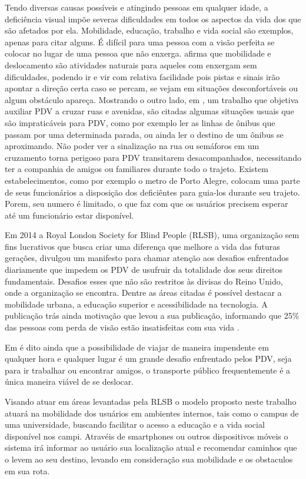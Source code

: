 \documentclass[english,brazilian]{UNISINOSmonografia}
\begin{document}
Tendo diversas causas possíveis e atingindo pessoas em qualquer idade, a deficiência visual impõe severas dificuldades em todos os aspectos da vida dos que são afetados por ela. Mobilidade, educação, trabalho e vida social são exemplos, apenas para citar alguns. É difícil para uma pessoa com a visão perfeita se colocar no lugar de uma pessoa que não enxerga.  afirma que mobilidade e deslocamento são atividades naturais para aqueles com enxergam sem dificuldades, podendo ir e vir com relativa facilidade pois pistas e sinais irão apontar a direção certa caso se percam, se vejam em situações desconfortáveis ou algum obstáculo apareça. Mostrando o outro lado, em , um trabalho que objetiva auxiliar PDV a cruzar ruas e avenidas, são citadas algumas situações usuais que são impraticáveis para PDV, como por exemplo ler as linhas de ônibus que passam por uma determinada parada, ou ainda ler o destino de um ônibus se aproximando. Não poder ver a sinalização na rua ou semáforos em um cruzamento torna perigoso para PDV transitarem desacompanhados, necessitando ter a companhia de amigos ou familiares durante todo o trajeto. Existem estabelecimentos, como por exemplo o metro de Porto Alegre, colocam uma parte de seus funcionários a disposição dos deficiêntes para guia-los durante seu trajeto. Porem, seu numero é limitado, o que faz com que os usuários precisem esperar até um funcionário estar disponível.

Em 2014 a Royal London Society for Blind People (RLSB), uma organização sem fins lucrativos que busca criar uma diferença que melhore a vida das futuras gerações, divulgou um manifesto para chamar atenção aos desafios enfrentados diariamente que impedem os PDV de usufruir da totalidade dos seus direitos fundamentais. Desafios esses que não são restritos às divisas do Reino Unido, onde a organização se encontra.
Dentre as áreas citadas é possível destacar a mobilidade urbana, a educação superior e acessibilidade na tecnologia. A publicação trás ainda motivação que levou a sua publicação, informando que 25\% das pessoas com perda de visão estão insatisfeitas com sua vida \cite{YouthManifesto}.

Em  é dito ainda que a possibilidade de viajar de maneira impendente em qualquer hora e qualquer lugar é um grande desafio enfrentado pelos PDV, seja para ir trabalhar ou encontrar amigos, o transporte público frequentemente é a única maneira viável de se deslocar.

Visando atuar em áreas levantadas pela RLSB o modelo proposto neste trabalho atuará na mobilidade dos usuários em ambientes internos, tais como o campus de uma universidade, buscando facilitar o acesso a educação e a vida social disponível nos campi. Atravéis de smartphones ou outros dispositivos móveis o sistema irá informar ao usuário sua localização atual e recomendar caminhos que o levem ao seu destino, levando em consideração sua mobilidade e os obstaculos em sua rota.
\end{document}
